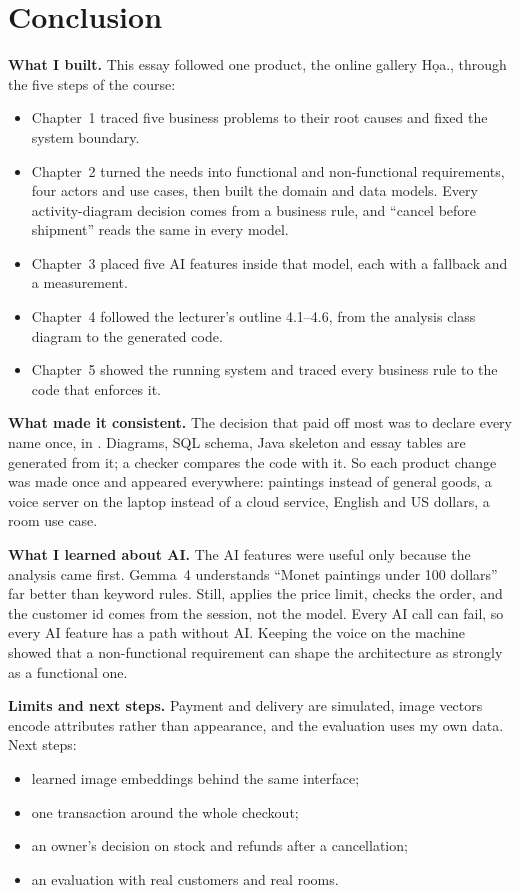 \chapter*{Conclusion}\label{ch:conclusion}

\textbf{What I built.} This essay followed one product, the online gallery Họa., through the five steps of the
course:
\begin{itemize}
\item Chapter~1 traced five business problems to their root causes and fixed the system boundary.
\item Chapter~2 turned the needs into \nFR{} functional and \nNFR{} non-functional requirements, four actors and
      \nUseCases{} use cases, then built the domain and data models. Every activity-diagram decision comes from a
      business rule, and ``cancel before shipment'' reads the same in every model.
\item Chapter~3 placed five AI features inside that model, each with a fallback and a measurement.
\item Chapter~4 followed the lecturer's outline 4.1--4.6, from the analysis class diagram to the generated code.
\item Chapter~5 showed the running system and traced every business rule to the code that enforces it.
\end{itemize}

\textbf{What made it consistent.} The decision that paid off most was to declare every name once, in
. Diagrams, SQL schema, Java skeleton and essay tables are generated from it; a checker
compares the code with it. So each product change was made once and appeared everywhere: paintings instead of
general goods, a voice server on the laptop instead of a cloud service, English and US dollars, a room use case.

\textbf{What I learned about AI.} The AI features were useful only because the analysis came first. Gemma~4
understands ``Monet paintings under 100 dollars'' far better than keyword rules. Still,  applies
the price limit,  checks the order, and the customer id comes from the session, not the model.
Every AI call can fail, so every AI feature has a path without AI. Keeping the voice on the machine showed that a
non-functional requirement can shape the architecture as strongly as a functional one.

\textbf{Limits and next steps.} Payment and delivery are simulated, image vectors encode attributes rather than
appearance, and the evaluation uses my own data. Next steps:
\begin{itemize}
\item learned image embeddings behind the same  interface;
\item one transaction around the whole checkout;
\item an owner's decision on stock and refunds after a cancellation;
\item an evaluation with real customers and real rooms.
\end{itemize}
